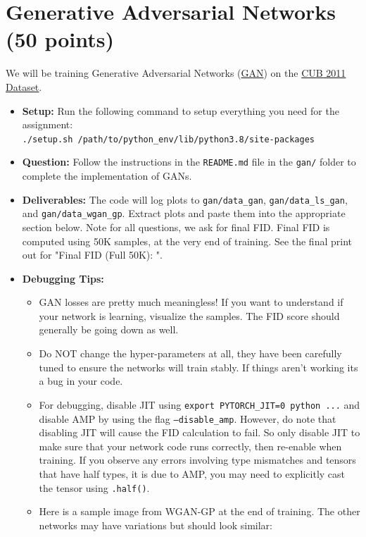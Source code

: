 \documentclass[11pt,addpoints,answers]{exam}
\numberwithin{equation}{section} %
\numberwithin{figure}{section} %
\numberwithin{table}{section} %
\begin{document}
\section{Generative Adversarial Networks (50 points)}
We will be training Generative Adversarial Networks (\href{(https://arxiv.org/pdf/1406.2661.pdf)}{GAN}) on the \href{http://www.vision.caltech.edu/visipedia/CUB-200-2011.html}{CUB 2011 Dataset}. 
\begin{itemize}
    \item \textbf{Setup:} Run the following command to setup everything you need for the assignment: \\ \texttt{./setup.sh /path/to/python\_env/lib/python3.8/site-packages}
\item \textbf{Question:} Follow the instructions in the \texttt{README.md} file in the \texttt{gan/} folder to complete the implementation of GANs.
\item \textbf{Deliverables:} The code will log plots to \texttt{gan/data\_gan}, \texttt{gan/data\_ls\_gan}, and \texttt{gan/data\_wgan\_gp}. Extract plots and paste them into the appropriate section below. Note for all questions, we ask for final FID. Final FID is computed using 50K samples, at the very end of training. See the final print out for "Final FID  (Full 50K): ". 
\item \textbf{Debugging Tips:}
    \begin{itemize}
        \item GAN losses are pretty much meaningless! If you want to understand if your network is learning, visualize the samples. The FID score should generally be going down as well.
        \item Do NOT change the hyper-parameters at all, they have been carefully tuned to ensure the networks will train stably. If things aren't working its a bug in your code.
        \item For debugging, disable JIT using \texttt{export PYTORCH\_JIT=0 python ...} and disable AMP by using the flag \texttt{--disable\_amp}. However, do note that disabling JIT will cause the FID calculation to fail. So only disable JIT to make sure that your network code runs correctly, then re-enable when training. If you observe any errors involving type mismatches and tensors that have half types, it is due to AMP, you may need to explicitly cast the tensor using \texttt{.half()}.
        \item 
        \begin{minipage}[t]{\linewidth}
          Here is a sample image from WGAN-GP at the end of training. The other networks may have variations but should look similar: 

\end{minipage}
\end{itemize}
\end{itemize}
\end{document}
